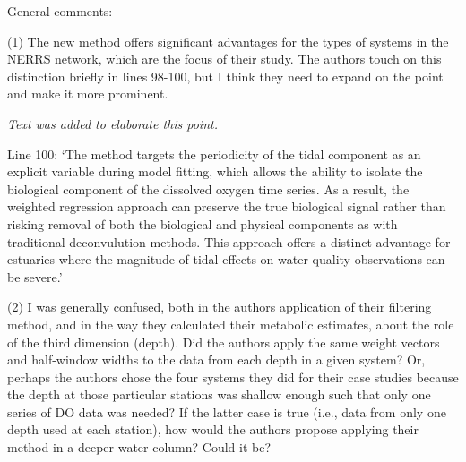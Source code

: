\documentclass[letterpaper,12pt]{article}\usepackage[]{graphicx}\usepackage[]{color}
\begin{document}
General comments:

(1) The new method offers significant advantages for the types of systems in the NERRS network, which are the focus of their study. The authors touch on this distinction briefly in lines 98-100, but I think they need to expand on the point and make it more prominent.

{\it Text was added to elaborate this point.

Line 100: `The method targets the periodicity of the tidal component as an explicit variable during model fitting, which allows the ability to isolate the biological component of the dissolved oxygen time series.  As a result, the weighted regression approach can preserve the true biological signal rather than risking removal of both the biological and physical components as with traditional deconvulution methods.  This approach offers a distinct advantage for estuaries where the magnitude of tidal effects on water quality observations can be severe.'
}

(2) I was generally confused, both in the authors application of their filtering method, and in the way they calculated their metabolic estimates, about the role of the third dimension (depth). Did the authors apply the same weight vectors and half-window widths to the data from each depth in a given system? Or, perhaps the authors chose the four systems they did for their case studies because the depth at those particular stations was shallow enough such that only one series of DO data was needed? If the latter case is true (i.e., data from only one depth used at each station), how would the authors propose applying their method in a deeper water column? Could it be? 
\end{document}

